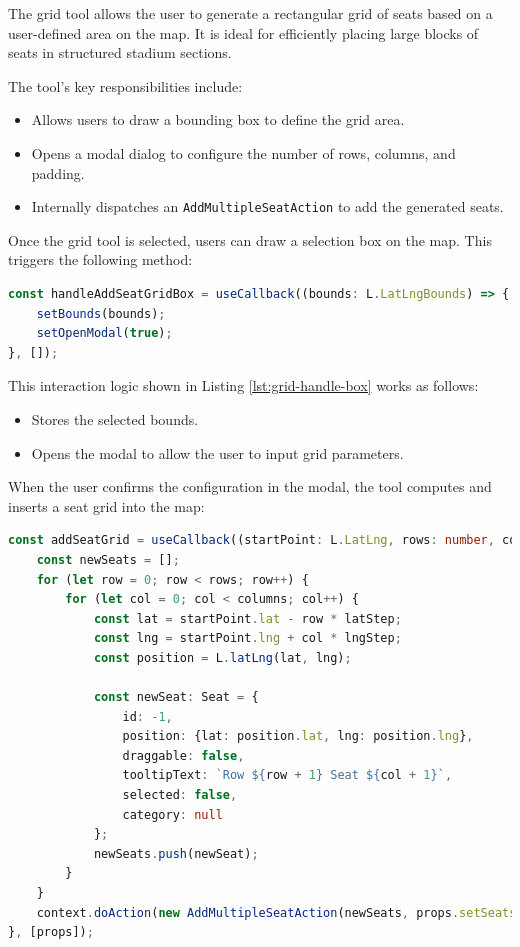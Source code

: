 The grid tool allows the user to generate a rectangular grid of seats based on a user-defined area on the map. It is ideal for efficiently placing large blocks of seats in structured stadium sections.

The tool’s key responsibilities include:
\begin{itemize}
    \item Allows users to draw a bounding box to define the grid area.
    \item Opens a modal dialog to configure the number of rows, columns, and padding.
    \item Internally dispatches an \texttt{AddMultipleSeatAction} to add the generated seats.
\end{itemize}

Once the grid tool is selected, users can draw a selection box on the map. This triggers the following method:

\begin{lstlisting}[language=TypeScript, caption=Handling Box Selection, label=lst:grid-handle-box]
const handleAddSeatGridBox = useCallback((bounds: L.LatLngBounds) => {
    setBounds(bounds);
    setOpenModal(true);
}, []);
\end{lstlisting}

This interaction logic shown in Listing \ref{lst:grid-handle-box} works as follows:
\begin{itemize}
    \item Stores the selected bounds.
    \item Opens the modal to allow the user to input grid parameters.
\end{itemize}

When the user confirms the configuration in the modal, the tool computes and inserts a seat grid into the map:

\begin{lstlisting}[language=TypeScript, caption=Add Grid Logic, label=lst:grid-add-seat-logic]
const addSeatGrid = useCallback((startPoint: L.LatLng, rows: number, columns: number, latStep: number, lngStep: number) => {
    const newSeats = [];
    for (let row = 0; row < rows; row++) {
        for (let col = 0; col < columns; col++) {
            const lat = startPoint.lat - row * latStep;
            const lng = startPoint.lng + col * lngStep;
            const position = L.latLng(lat, lng);

            const newSeat: Seat = {
                id: -1,
                position: {lat: position.lat, lng: position.lng},
                draggable: false,
                tooltipText: `Row ${row + 1} Seat ${col + 1}`,
                selected: false,
                category: null
            };
            newSeats.push(newSeat);
        }
    }
    context.doAction(new AddMultipleSeatAction(newSeats, props.setSeats))
}, [props]);
\end{lstlisting}

